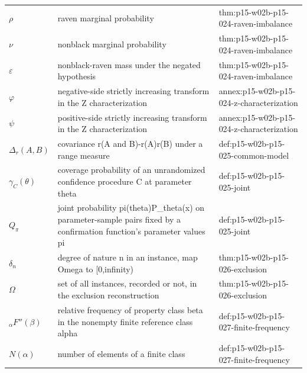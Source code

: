 \begin{longtable}{@{}p{}p{}p{}@{}}
\(\rho\) & raven marginal probability & thm:\allowbreak{}p15-\allowbreak{}w02b-\allowbreak{}p15-\allowbreak{}024-\allowbreak{}raven-\allowbreak{}imbalance \\
\(\nu\) & nonblack marginal probability & thm:\allowbreak{}p15-\allowbreak{}w02b-\allowbreak{}p15-\allowbreak{}024-\allowbreak{}raven-\allowbreak{}imbalance \\
\(\varepsilon\) & nonblack-raven mass under the negated hypothesis & thm:\allowbreak{}p15-\allowbreak{}w02b-\allowbreak{}p15-\allowbreak{}024-\allowbreak{}raven-\allowbreak{}imbalance \\
\(\varphi\) & negative-side strictly increasing transform in the Z characterization & annex:\allowbreak{}p15-\allowbreak{}w02b-\allowbreak{}p15-\allowbreak{}024-\allowbreak{}z-\allowbreak{}characterization \\
\(\psi\) & positive-side strictly increasing transform in the Z characterization & annex:\allowbreak{}p15-\allowbreak{}w02b-\allowbreak{}p15-\allowbreak{}024-\allowbreak{}z-\allowbreak{}characterization \\
\(\Delta_r(A,\allowbreak B)\) & covariance r(A and B)-r(A)r(B) under a range measure & def:\allowbreak{}p15-\allowbreak{}w02b-\allowbreak{}p15-\allowbreak{}025-\allowbreak{}common-\allowbreak{}model \\
\(\gamma_C(\theta)\) & coverage probability of an unrandomized confidence procedure C at parameter theta & def:\allowbreak{}p15-\allowbreak{}w02b-\allowbreak{}p15-\allowbreak{}025-\allowbreak{}joint \\
\(Q_\pi\) & joint probability pi(theta)P\_theta(x) on parameter-sample pairs fixed by a confirmation function's parameter values pi & def:\allowbreak{}p15-\allowbreak{}w02b-\allowbreak{}p15-\allowbreak{}025-\allowbreak{}joint \\
\(\delta_n\) & degree of nature n in an instance, map Omega to [0,infinity) & thm:\allowbreak{}p15-\allowbreak{}w02b-\allowbreak{}p15-\allowbreak{}026-\allowbreak{}exclusion \\
\(\Omega\) & set of all instances, recorded or not, in the exclusion reconstruction & thm:\allowbreak{}p15-\allowbreak{}w02b-\allowbreak{}p15-\allowbreak{}026-\allowbreak{}exclusion \\
\({}_{\alpha}F''(\beta)\) & relative frequency of property class beta in the nonempty finite reference class alpha & def:\allowbreak{}p15-\allowbreak{}w02b-\allowbreak{}p15-\allowbreak{}027-\allowbreak{}finite-\allowbreak{}frequency \\
\(N(\alpha)\) & number of elements of a finite class & def:\allowbreak{}p15-\allowbreak{}w02b-\allowbreak{}p15-\allowbreak{}027-\allowbreak{}finite-\allowbreak{}frequency \\

\end{longtable}
